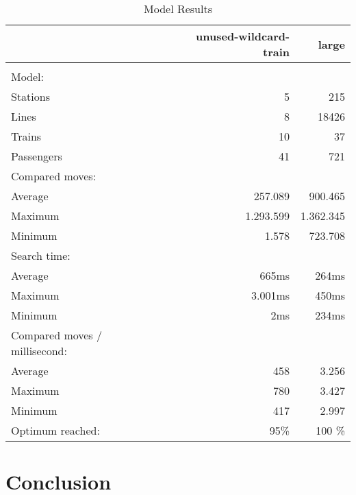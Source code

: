 \documentclass[a4paper,12pt,parskip]{article}
\begin{document}
\begin{center}
\begin{table}[ht]
\caption{Model Results}
\label{table:results}
\begin{tabular}{ l r r }
    \hline\hline
        & unused-wildcard-train & large \\
    \hline\\
    Model: &  & \\[3pt]
    \hspace{3mm}Stations & 5 & 215 \\ 
    \hspace{3mm}Lines & 8 & 18426 \\ 
    \hspace{3mm}Trains & 10 & 37 \\ 
    \hspace{3mm}Passengers & 41 & 721 \\[3pt] 
    Compared moves: &  & \\[3pt]
    \hspace{3mm}Average & 257.089 & 900.465 \\ 
    \hspace{3mm}Maximum & 1.293.599 & 1.362.345 \\ 
    \hspace{3mm}Minimum & 1.578 & 723.708 \\[3pt] 
    Search time: &  & \\[3pt]
    \hspace{3mm}Average & 665ms & 264ms \\ 
    \hspace{3mm}Maximum & 3.001ms & 450ms \\ 
    \hspace{3mm}Minimum & 2ms & 234ms \\ [3pt]
    Compared moves / millisecond: &  & \\ [3pt]
    \hspace{3mm}Average & 458 & 3.256 \\ 
    \hspace{3mm}Maximum & 780 & 3.427 \\ 
    \hspace{3mm}Minimum & 417 & 2.997 \\ [3pt] 
    Optimum reached: & 95\% & 100 \% \\ [3pt]
    \hline
\end{tabular}
\end{table}
\end{center}

\section{Conclusion}
\end{document}
